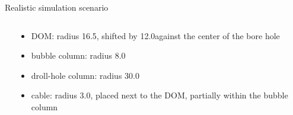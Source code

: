 
\begin{frame}[fragile]{Realistic simulation scenario} %

  \begin{columns}
    \begin{column}{0.6\textwidth}


    \end{column}
    \begin{column}{0.4\textwidth}

      \begin{itemize}
        \item DOM: radius 16.5\cm, shifted by 12.0\cm against the center of the bore hole
        \item bubble column: radius 8.0\cm
        \item droll-hole column: radius 30.0\cm
        \item cable: radius 3.0\cm, placed next to the DOM, partially within the bubble column
      \end{itemize}

      \vspace{1cm}
    \end{column}
  \end{columns}

\end{frame}

